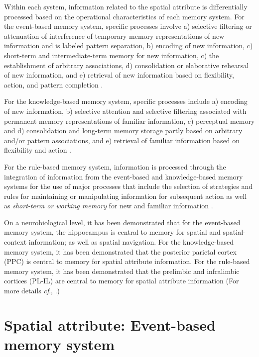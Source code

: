 \documentclass[doc, longtable]{apa6}
\begin{document}
Within each system, information related to the spatial attribute is differentially processed based on the operational characteristics of each memory system. For the event-based memory system, specific processes involve a) selective filtering or attenuation of interference of temporary memory representations of new information and is labeled pattern separation, b) encoding of new information, c) short-term and intermediate-term memory for new information, c) the establishment of arbitrary associations, d) consolidation or elaborative rehearsal of new information, and e) retrieval of new information based on flexibility, action, and pattern completion \parencite{Kesner2013e,Kesner1998c}. 

For the knowledge-based memory system, specific processes include a) encoding of new information, b) selective attention and selective filtering associated with permanent memory representations of familiar information, c) perceptual memory and d) consolidation and long-term memory storage partly based on arbitrary and/or pattern associations, and e) retrieval of familiar information based on flexibility and action \parencite{Kesner2013a}.

For the rule-based memory system, information is processed through the integration of information from the event-based and knowledge-based memory systems for the use of major processes that include the selection of strategies and rules for maintaining or manipulating information for subsequent action as well as \textit{short-term or working memory} for new and familiar information \parencite{Kesner2011a,Churchwell2011a,Kesner2000}. 

On a neurobiological level, it has been demonstrated that for the event-based memory system, the hippocampus is central to memory for spatial and spatial-context information; as well as spatial navigation. For the knowledge-based memory system, it has been demonstrated that the posterior parietal cortex (PPC) is central to memory for spatial attribute information. For the rule-based memory system, it has been demonstrated that the prelimbic and infralimbic cortices (PL-IL) are central to memory for spatial attribute information (For more details \textit{cf}., \cite{Kesner2011a,Churchwell2011a,Kesner2013a,Kesner1989,Kesner1998c,Kesner2000, Kesner2002,Kesner1987a,Kesner1989b,Kesner1996}.)

\section{Spatial attribute: Event-based memory system}
\end{document}
